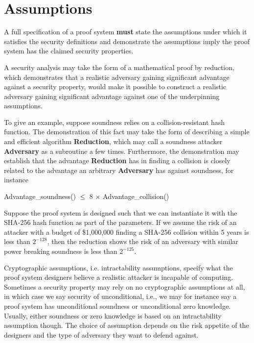 \section{Assumptions}
\label{security:assumptions}
 
A full specification of a proof system \textbf{must} state the assumptions under which it satisfies the security definitions and demonstrate the assumptions imply the proof system has the claimed security properties.
 
A security analysis may take the form of a mathematical proof by reduction, which demonstrates that a realistic adversary gaining significant advantage against a security property, would make it possible to construct a realistic adversary gaining significant advantage against one of the underpinning assumptions.
 
To give an example, suppose soundness relies on a collision-resistant hash function. The demonstration of this fact may take the form of describing a simple and efficient algorithm \textbf{Reduction}, which may call a soundness attacker \textbf{Adversary} as a subroutine a few times. Furthermore, the demonstration may establish that the advantage \textbf{Reduction} has in finding a collision is closely related to the advantage an arbitrary \textbf{Adversary} has against soundness, for instance

Advantage\_soundness(\params) $\leq$ 8 $\times$ Advantage\_collision(\params)
 
Suppose the proof system is designed such that we can instantiate it with the SHA-256 hash function as part of the parameters.
If we assume the risk of an attacker with a budget of \$1,000,000 finding a SHA-256 collision within 5 years is less than $2^{-128}$, then the reduction shows the risk of an adversary with similar power breaking soundness is less than $2^{-125}$.
 

Cryptographic assumptions, i.e. intractability assumptions, specify what the proof system designers believe a realistic attacker is incapable of computing.
Sometimes a security property may rely on no cryptographic assumptions at all, in which case we say security of unconditional, i.e., we may for instance say a proof system has unconditional soundness or unconditional zero knowledge. Usually, either soundness or zero knowledge is based on an intractability assumption though.
The choice of assumption depends on the risk appetite of the designers and the type of adversary they want to defend against.
 
